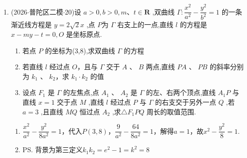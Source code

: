 \begin{enumerate}
\begin{jieda}
\begin{enumerate}
            由 $\left\{  \begin{array}{l} y = k\left( {x - 1}\right) \\  {y}^{2} = {4x} \end{array}\right.$ ,得 ${k}^{2}{x}^{2} - \left( {2{k}^{2} + 4}\right) x + {k}^{2} = 0$，根据韦达定理有$\left\{\begin{array}{l}
                    {x}_{1} + {x}_{2} = 2 + \dfrac{4}{{k}^{2}}  \\
                    {x}_{1}{x}_{2} = 1
            \end{array}\right.$ 根据两直线垂直可知两直线斜率乘积为$-1$，则可得 $\left\{\begin{array}{l}
                    {x}_{3} + {x}_{4} = 2 + 4k^2  \\
                    {x}_{3}{x}_{4} = 1
            \end{array}\right.$
            
            故$\vv{AD} \cdot  \vv{EB} = 1 + \left( {2 + \dfrac{4}{{k}^{2}}}\right)  + 1 + 1 + \left( {2 + 4{k}^{2}}\right)  + 1 = 8 + 4\left( {{k}^{2} + \dfrac{1}{{k}^{2}}}\right)  \geq  8 + 4 \times  2\sqrt{{k}^{2} \cdot  \dfrac{1}{{k}^{2}}} = {16}
            $
            
            当且仅当 ${k}^{2} = \dfrac{1}{{k}^{2}}$ 即 $k =  \pm  1$ 时, $\vv{AD} \cdot  \vv{EB}$ 取最小值 16.
        \end{enumerate}
    \end{jieda}
    \item (2026$\cdot$普陀区二模$\cdot$20)设 $a > 0,b > 0,m\text{、}t \in  \mathbf{R}$ ,双曲线 $\Gamma  : \dfrac{{x}^{2}}{{a}^{2}} - \dfrac{{y}^{2}}{{b}^{2}} = 1$ 的一条渐近线方程是 $y = 2\sqrt{2}x$ ,点 $P$为 $\Gamma$ 右支上的一点,直线 $l$ 的方程是 $x - {my} - t = 0,O$ 是坐标原点.
    \begin{enumerate}
        \item 若点 $P$ 的坐标为(3,8),求双曲线 $\Gamma$ 的方程
        \item 若直线 $l$ 经过点 $O$，且与 $\Gamma$ 交于 $A$ 、 $B$ 两点,直线 ${PA}$ 、 ${PB}$ 的斜率分别为 ${k}_{1}$ 、 ${k}_{2}$，求 ${k}_{1} \cdot  {k}_{2}$ 的值
        \item 设点 ${F}_{1}$ 是 $\Gamma$ 的左焦点,点 ${A}_{1}$ 、 ${A}_{2}$ 是 $\Gamma$ 的左、右两个顶点,直线 ${A}_{1}P$ 与直线 $x = 1$ 交于点 $M$ ,直线 $l$ 经过点 $P$ 与 $\Gamma$ 的右支交于另外一点 $Q$ ,若 $a = 3$ ,且直线 ${MQ}$ 恒过点 ${A}_{2}$ ,求$\bigtriangleup {F}_{1}{PQ}$ 周长的取值范围.
    \end{enumerate}
    \begin{jieda}
        \begin{enumerate}
            \item $\dfrac{x^2}{a^2} - \dfrac{y^2}{8a^2} = 1$，代入$P(3, 8)$，$\dfrac{9}{a^2} - \dfrac{64}{8a^2} = 1$，解得$a = 1$，故$x^2 - \dfrac{y^2}{8} = 1$.
            \item \ps 背景为第三定义$k_1k_2 = e^2 - 1 = k^2 = 8$


\end{enumerate}
\end{jieda}
\end{enumerate}
